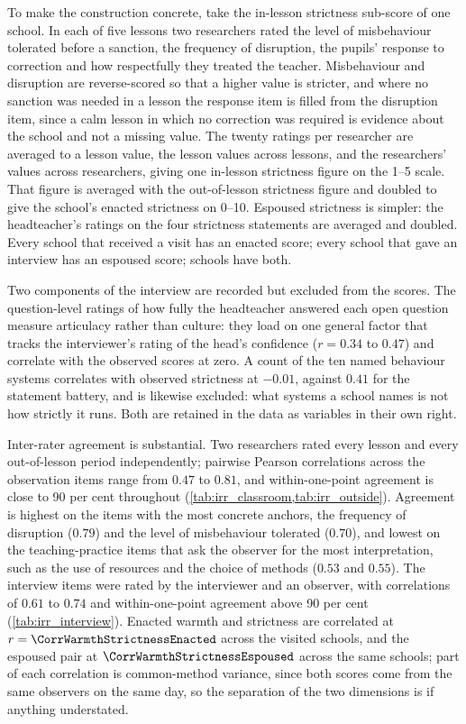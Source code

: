 To make the construction concrete, take the in-lesson strictness sub-score
of one school. In each of five lessons two researchers rated the level of
misbehaviour tolerated before a sanction, the frequency of disruption, the
pupils' response to correction and how respectfully they treated the teacher.
Misbehaviour and disruption are reverse-scored so that a higher value is
stricter, and where no sanction was needed in a lesson the response item is
filled from the disruption item, since a calm lesson in which no correction
was required is evidence about the school and not a missing value. The
twenty ratings per researcher are averaged to a lesson value, the lesson
values across lessons, and the researchers' values across researchers, giving
one in-lesson strictness figure on the 1--5 scale. That figure is averaged
with the out-of-lesson strictness figure and doubled to give the school's
enacted strictness on 0--10. Espoused strictness is simpler: the
headteacher's ratings on the four strictness statements are averaged and
doubled. Every school that received a visit has an enacted score; every
school that gave an interview has an espoused score; \NTierOne{} schools
have both.

Two components of the interview are recorded but excluded from the scores. The
question-level ratings of how fully the headteacher answered each open
question measure articulacy rather than culture: they load on one general
factor that tracks the interviewer's rating of the head's confidence
($r = 0.34$ to $0.47$) and correlate with the observed scores at zero. A count
of the ten named behaviour systems correlates with observed strictness at
$-0.01$, against $0.41$ for the statement battery, and is likewise excluded:
what systems a school names is not how strictly it runs. Both are retained in
the data as variables in their own right.

Inter-rater agreement is substantial. Two researchers rated every lesson and
every out-of-lesson period independently; pairwise Pearson correlations across
the observation items range from $0.47$ to $0.81$, and within-one-point
agreement is close to 90 per cent throughout
(\cref{tab:irr_classroom,tab:irr_outside}). Agreement is highest on the items
with the most concrete anchors, the frequency of disruption ($0.79$) and the
level of misbehaviour tolerated ($0.70$), and lowest on the teaching-practice
items that ask the observer for the most interpretation, such as the use of
resources and the choice of methods ($0.53$ and $0.55$). The interview
items were rated by the interviewer and an observer, with correlations of
$0.61$ to $0.74$ and within-one-point agreement above 90 per cent
(\cref{tab:irr_interview}). Enacted warmth and strictness are correlated at
$r = \CorrWarmthStrictnessEnacted$ across the \NTierOne{} visited schools,
and the espoused pair at $\CorrWarmthStrictnessEspoused$ across the same
schools; part of each correlation is common-method variance, since both
scores come from the same observers on the same day, so the separation of
the two dimensions is if anything understated.

